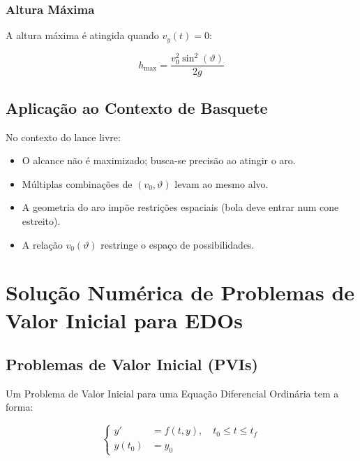 \documentclass[12pt,a4paper]{article}
\begin{document}
\subsubsection{Altura Máxima}

A altura máxima é atingida quando $v_y(t) = 0$:

\begin{equation}
h_{\text{max}} = \frac{v_0^2 \sin^2(\vartheta)}{2g}
\end{equation}

\subsection{Aplicação ao Contexto de Basquete}

No contexto do lance livre:

\begin{itemize}
    \item O alcance não é maximizado; busca-se precisão ao atingir o aro.
    \item Múltiplas combinações de $(v_0, \vartheta)$ levam ao mesmo alvo.
    \item A geometria do aro impõe restrições espaciais (bola deve entrar num cone estreito).
    \item A relação $v_0(\vartheta)$ restringe o espaço de possibilidades.
\end{itemize}

\newpage


\section{Solução Numérica de Problemas de Valor Inicial para EDOs}

\subsection{Problemas de Valor Inicial (PVIs)}

Um Problema de Valor Inicial para uma Equação Diferencial Ordinária tem a forma:

\begin{equation}
\left\{\begin{aligned}
y' &= f(t, y), \quad t_0 \leq t \leq t_f \\
y(t_0) &= y_0
\end{aligned}\right.
\end{equation}
\end{document}
